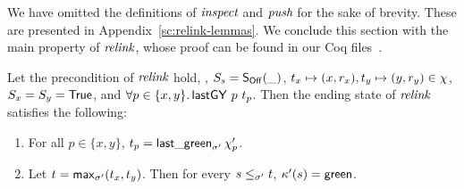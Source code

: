 

We have omitted the definitions of $\textit{inspect}$ and $\textit{push}$
for the sake of brevity. These are presented in
Appendix~\ref{sc:relink-lemmas}. We conclude this section with the
main property of $\textit{relink}$, whose proof can be found in our Coq
files~\cite{CoqFiles}.

\begin{lemma}\label{lem:relink-prefix}
Let the precondition of $\textit{relink}$ hold, \ie, $S_s = \mathsf{S_{Off}}(\_)$,
$t_x \mapsto (x, r_x), t_y \mapsto (y, r_y) \in \chi$, $S_x = S_y =
\mathsf{True}$, and $\forall p \in \{x,y\}\mathord{.}\, \mathsf{lastGY}\ p\ t_p$. Then the ending
state of $\textit{relink}$ satisfies the following:
 \begin{enumerate}
 \item\label{lem:relink-lgVy} For all $p \in \{x, y\}$, $t_p =
   \mathsf{last\_green}_{\sigma'}\, \chi_p'$.
 \item\label{lem:relink-green} Let $t = \mathsf{max}_{\sigma'}
   (t_x,t_y)$. Then for every $s \leq_{\sigma'}t$, $\kappa'(s) = \mathsf{green}$.
 \end{enumerate}
\end{lemma}



